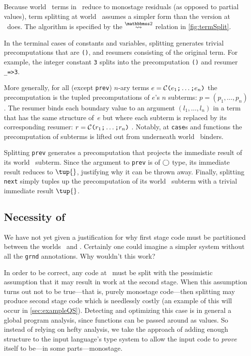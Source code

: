 \begin{abstrsyn}
Because world \bbtwo\ terms in \lang\ reduce to monostage residuals (as opposed to partial values),
term splitting at world \bbtwo\ assumes a simpler form than the version at \bbonem\ does. 
The algorithm is specified by the $\splittwosym$ relation in \cref{fig:termSplit}.

In the terminal cases of
constants and variables, splitting generates trivial precomputations that are \texttt{()}, and resumers consisting of the original term.
For example, the integer constant \texttt{3} splits into the
precomputation \texttt{()} and resumer \texttt{\_=>3}.

More generally, for all (except \texttt{prev}) 
$n$-ary terms $e = \mathcal{C}\texttt{(} e_1 \texttt{;} \ldots \texttt{;} e_n \texttt{)}$ 
the precomputation is the tupled precomputations of $e$'s $n$ subterms:
$p=(p_1,\ldots,p_n)$.  The resumer binds each boundary value to an
argument $(l_1,\ldots,l_n)$ in a term that has the same structure
of~$e$ but where each subterm is replaced by its corresponding resumer:
$r = \mathcal{C}\texttt{(} r_1 \texttt{;} \ldots \texttt{;} r_n \texttt{)}$ .
Notably, at \texttt{case}s and functions the
precomputation of subterms is lifted out from underneath world \bbtwo\ binders.  

Splitting \texttt{prev} generates a precomputation that projects the immediate
result of its world \bbone\ subterm.
Since the argument to \texttt{prev} is of $\bigcirc$ type, its immediate result reduces to $\tup{}$, justifying why it can be thrown away.
Finally, splitting \texttt{next} simply tuples up the precomputation of its
world \bbtwo\ subterm with a trivial immediate result $\tup{}$.

\subsection {Necessity of \bbonep}
\label{sec:needGround}

We have not yet given a justification for why first stage code must be
partitioned between the worlds \bbonem\ and \bbonep.
Certainly one could imagine a simpler system without all the \texttt{grnd} annotations.  
Why wouldn't this work?

In order to be correct, any code at \bbonem\ must be split with the 
pessimistic assumption that it may result in work at the second stage.
When this assumption turns out not to be true---that is, purely monostage code---then 
splitting may produce second stage code which is needlessly costly 
(an example of this will occur in \ref{sec:exampleQS}).
Detecting and optimizing this case is in general a global program analysis,
since functions can be passed around as values.  
So instead of relying on hefty analysis, 
we take the approach of adding enough structure to the input language's type system to
allow the input code to {\em prove} itself to be---in some parts---monostage.


\end{abstrsyn}
